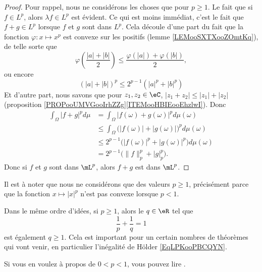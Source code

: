 \begin{proof}
	Pour rappel, nous ne considérons les choses que pour \( p\geq 1\). Le fait que si \( f\in L^p\), alors \( \lambda f\in L^p\) est évident. Ce qui est moins immédiat, c'est le fait que \( f+g\in L^p\) lorsque \( f\) et \( g\) sont dans \( L^p\). Cela découle d'une part du fait que la fonction \( \varphi\colon x\mapsto x^p\) est convexe sur les positifs (lemme \ref{LEMooSXTXooZOmtKq}), de telle sorte que
	\begin{equation}
		\varphi\left( \frac{ |a|+|b| }{2} \right)\leq\frac{ \varphi(|a|)+\varphi(|b|) }{2},
	\end{equation}
	ou encore
	\begin{equation}    \label{EqZFSduFa}
		(|a|+|b|)^p\leq 2^{p-1}(|a|^p+|b|^p)
	\end{equation}
    Et d'autre part, nous savons que pour \( z_1,z_2\in \eC\), \( | z_1+z_2 |\leq | z_1 |+| z_2 |\) (proposition \ref{PROPooUMVGooIrhZZg}\ref{ITEMooHBIEooEhzlwI}). Donc
	\begin{subequations}        \label{EQooKRMEooSLHUUc}
		\begin{align}
			\int_{\Omega}| f+g |^pd\mu & =\int_{\Omega}| f(\omega)+g(\omega) |^pd\mu(\omega)                     \\
			                           & \leq \int_{\Omega}\big( | f(\omega) |+| g(\omega) | \big)^pd\mu(\omega) \\
			                           & \leq 2^{p-1}\big( | f(\omega) |^p+| g(\omega) |^p \big)d\mu(\omega)     \\
			                           & =2^{p-1}\big( \| f \|_p^p+| g |_p^p \big).
		\end{align}
	\end{subequations}
	Donc si \( f\) et \( g\) sont dans \( \mL^p\), alors \( f+g\) est dans \( \mL^p\).
\end{proof}

\begin{normaltext}
	Il est à noter que nous ne considérons que des valeurs \( p\geq 1\), précisément parce que la fonction \( x\mapsto | x |^p\) n'est pas convexe lorsque \( p<1\).

	Dans le même ordre d'idées, si \( p\geq 1\), alors le \( q\in \eR\) tel que
	\begin{equation}
		\frac{1}{ p }+\frac{1}{ q }=1
	\end{equation}
	est également \( q\geq 1\). Cela est important pour un certain nombres de théorèmes qui vont venir, en particulier l'inégalité de Hölder \eqref{EqLPKooPBCQYN}.

	Si vous en voulez à propos de \( 0<p<1\), vous pouvez lire \cite{ooECQXooZUqbSO}.
\end{normaltext}

